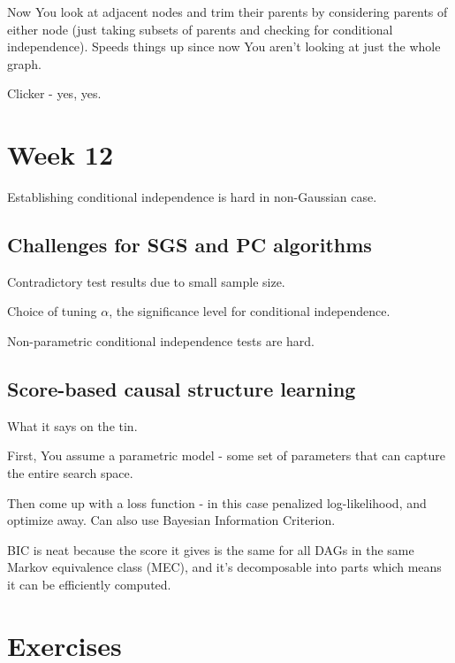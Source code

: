 \documentclass{article}
\begin{document}
		Now You look at adjacent nodes and trim their parents by considering parents of either node (just taking subsets of parents and checking for conditional independence). Speeds things up since now You aren't looking at just the whole graph.
		
		Clicker - yes, yes.
		
\section{Week 12}

	Establishing conditional independence is hard in non-Gaussian case.
	
	\subsection{Challenges for SGS and PC algorithms}
	
		Contradictory test results due to small sample size.
		
		Choice of tuning $\alpha$, the significance level for conditional independence.
		
		Non-parametric conditional independence tests are hard.
		
	\subsection{Score-based causal structure learning}
	
		What it says on the tin.
		
		First, You assume a parametric model - some set of parameters that can capture the entire search space.
		
		Then come up with a loss function - in this case penalized log-likelihood, and optimize away. Can also use Bayesian Information Criterion.
		
		BIC is neat because the score it gives is the same for all DAGs in the same Markov equivalence class (MEC), and it's decomposable into parts which means it can be efficiently computed.
		
		
		
		
		
		
		
		
		
		
		
		
		
		
		
		
		 
		 
\newpage
\section{Exercises}
	
\end{document}
